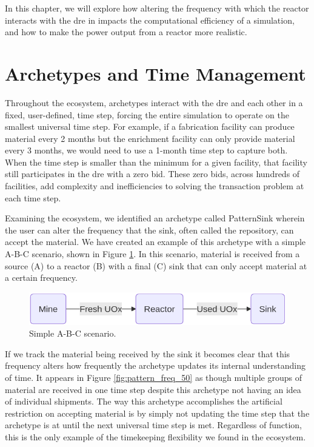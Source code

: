 In this chapter, we will explore how altering the frequency with which the \cycamore reactor interacts with the \gls{dre} in \cyclus impacts the computational efficiency of a simulation, and how to make the power output from a reactor more realistic.

\section{Archetypes and Time Management}
\label{sec:archetypes_and_time_management}

Throughout the \cyclus ecosystem, archetypes interact with the \gls{dre} and
each other in a fixed, user-defined, time step, forcing the entire simulation
to operate on the smallest universal time step. For example, if a fabrication
facility can produce material every 2 months but the enrichment facility can
only provide material every 3 months, we would need to use a 1-month time step
to capture both. When the time step is smaller than the minimum for a given
facility, that facility still participates in the \gls{dre} with a zero bid.
These zero bids, across hundreds of facilities, add complexity and
inefficiencies to solving the transaction problem at each time step.

Examining the \cyclus ecosystem, we identified an archetype called PatternSink
wherein the user can alter the frequency that the sink, often called
the repository, can accept the material. We have created an example of this
archetype with a simple A-B-C scenario, shown in Figure \ref{fig:a-b-c}. In
this scenario, material is received from a source (A) to a reactor (B) with a
final (C) sink that can only accept material at a certain frequency.

\begin{figure}[H]
    \centering
    \includegraphics[scale=0.4]{images/cyclus/a-b-c.png}
    \caption{Simple A-B-C scenario.}
    \label{fig:a-b-c}
\end{figure}

If we track the material being received by the sink it becomes clear that this
frequency alters how frequently the archetype updates its internal
understanding of time. It appears in Figure \ref{fig:pattern_freq_50} as though
multiple groups of material are received in one time step despite this
archetype not having an idea of individual shipments. The way this archetype
accomplishes the artificial restriction on accepting material is by simply not
updating the time step that the archetype is at until the next universal time
step is met. Regardless of function, this is the only example of the
timekeeping flexibility we found in the ecosystem.

